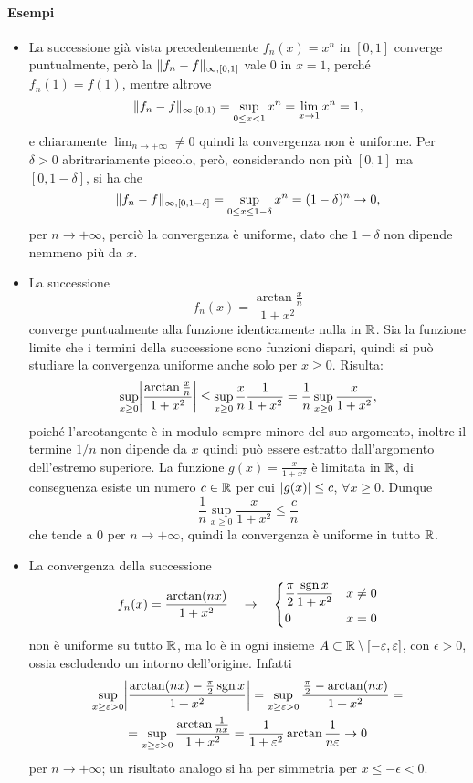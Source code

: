 \paragraph{Esempi}
\begin{itemize}
\item La successione già vista precedentemente $f_n(x)=x^n$ in $[0,1]$ converge puntualmente, però la $\norm{f_n-f}_{\infty,[0,1]}$ vale 0 in $x=1$, perché $f_n(1)=f(1)$, mentre altrove
\[
\norm{f_n-f}_{\infty,[0,1)}=\sup_{0\leq x<1} x^n=\lim_{x\to 1}x^n=1,
\]
e chiaramente $\lim_{n\to+\infty}\neq 0$ quindi la convergenza non è uniforme. Per $\delta>0$ abritrariamente piccolo, però, considerando non più $[0,1]$ ma $[0,1-\delta]$, si ha che 
\[
\norm{f_n-f}_{\infty,[0,1-\delta]}=\sup_{0\leq x\leq 1-\delta} x^n=(1-\delta)^n\to 0,
\]
per $n\to+\infty$, perciò la convergenza è uniforme, dato che $1-\delta$ non dipende nemmeno più da $x$.
\item La successione
\[
f_n(x)=\frac{\arctan\frac{x}{n}}{1+x^2}
\]
converge puntualmente alla funzione identicamente nulla in $\R$. Sia la funzione limite che i termini della successione sono funzioni dispari, quindi si può studiare la convergenza uniforme anche solo per $x\geq 0$. Risulta:
\[
	\sup_{x\geq 0}\abs[\bigg]{\frac{\arctan\frac{x}{n}}{1+x^2}}\leq\sup_{x\geq 0}\frac{x}{n}\frac1{1+x^2}=\frac1{n}\sup_{x\geq 0}\frac{x}{1+x^2},
\]
poiché l'arcotangente è in modulo sempre minore del suo argomento, inoltre il termine $1/n$ non dipende da $x$ quindi può essere estratto dall'argomento dell'estremo superiore. La funzione $g(x)=\frac{x}{1+x^2}$ è limitata in $\R$, di conseguenza esiste un numero $c\in\R$ per cui $\abs{g(x)}\leq c$, $\forall x\geq 0$. Dunque
\[
\frac1{n}\sup_{x\geq 0}\frac{x}{1+x^2}\leq\frac{c}{n}
\]
che tende a 0 per $n\to+\infty$, quindi la convergenza è uniforme in tutto $\R$.
\item La convergenza della successione
\[
f_n(x)=\frac{\arctan(nx)}{1+x^2}\quad\to\quad\begin{dcases}\frac{\pi}2\frac{\sgn x}{1+x^2}&x\neq 0\\ 0&x=0\end{dcases}
\]
non è uniforme su tutto $\R$, ma lo è in ogni insieme $A\subset\R\setminus[-\epsilon,\epsilon]$, con $\epsilon>0$, ossia escludendo un intorno dell'origine. Infatti
\begin{multline*}
	\sup_{x\geq\epsilon>0}\abs[\bigg]{\frac{\arctan(nx)-\frac{\pi}2\sgn x}{1+x^2}}=\sup_{x\geq\epsilon>0}\frac{\frac{\pi}2-\arctan(nx)}{1+x^2}=\\
=\sup_{x\geq\epsilon>0}\frac{\arctan\frac1{nx}}{1+x^2}=\frac1{1+\epsilon^2}\arctan\frac1{n\epsilon}\to 0
\end{multline*}
per $n\to+\infty$; un risultato analogo si ha per simmetria per $x\leq -\epsilon<0$.
\end{itemize}

